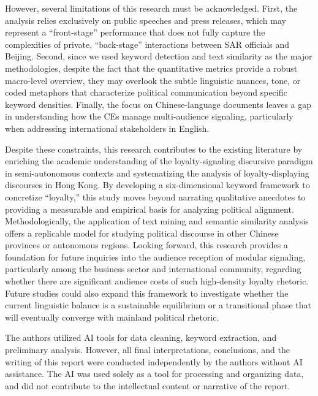 \documentclass[9pt,a4paper,twocolumn,twoside]{rho-class/rho}
\begin{document}
    However, several limitations of this research must be acknowledged. First, the analysis relies exclusively on public speeches and press releases, which may represent a 
    ``front-stage'' performance that does not fully capture the complexities of private, ``back-stage'' interactions between SAR officials and Beijing. Second, since we used 
    keyword detection and text similarity as the major methodologies, despite the fact that the quantitative metrics provide a robust macro-level overview, they may overlook 
    the subtle linguistic nuances, tone, or coded metaphors that characterize political communication beyond specific keyword densities. Finally, the focus on Chinese-language 
    documents leaves a gap in understanding how the CEs manage multi-audience signaling, particularly when addressing international stakeholders in English.

    Despite these constraints, this research contributes to the existing literature by enriching the academic understanding of the loyalty-signaling discursive paradigm in 
    semi-autonomous contexts and systematizing the analysis of loyalty-displaying discourses in Hong Kong. By developing a six-dimensional keyword framework to concretize 
    ``loyalty,'' this study moves beyond narrating qualitative anecdotes to providing a measurable and empirical basis for analyzing political alignment. Methodologically, 
    the application of text mining and semantic similarity analysis offers a replicable model for studying political discourse in other Chinese provinces or autonomous regions. 
    Looking forward, this research provides a foundation for future inquiries into the audience reception of modular signaling, particularly among the business sector and 
    international community, regarding whether there are significant audience costs of such high-density loyalty rhetoric. Future studies could also expand this framework to 
    investigate whether the current linguistic balance is a sustainable equilibrium or a transitional phase that will eventually converge with mainland political rhetoric. 
    

    \begin{note}[frametitle=Notes on AI Use]
        The authors utilized AI tools for data cleaning, keyword extraction, and preliminary analysis. However, all final interpretations, conclusions, and the writing of this report were conducted independently by the authors without AI assistance. The AI was used solely as a tool for processing and organizing data, and did not contribute to the intellectual content or narrative of the report.
    \end{note}
\end{document}
